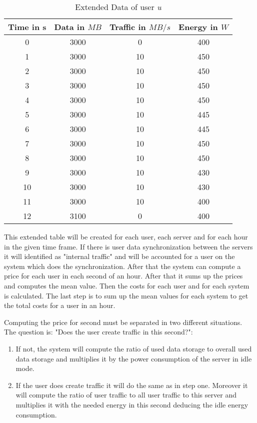  
 \begin{table}
 \centering
 \caption{Extended Data of user \textit{u}}
 \begin{tabular}{|c|c|c|c|}
  \hline Time in s & Data in $MB$ & Traffic in $MB/s$ & Energy in $W$ \\ 
   \hline 0 & 3000 & 0 & 400 \\ 
  \hline 1 & 3000 & 10 & 450 \\ 
  \hline 2 & 3000 & 10 & 450 \\ 
  \hline 3 & 3000 & 10 & 450\\ 
  \hline 4 & 3000 & 10 & 450 \\ 
  \hline 5 & 3000 & 10 & 445 \\
  \hline 6 & 3000 & 10 & 445 \\ 
  \hline 7 & 3000 & 10 & 450\\ 
  \hline 8 & 3000 & 10 & 450 \\ 
  \hline 9 & 3000 & 10 & 430 \\  
  \hline 10 & 3000 & 10 & 430 \\
   \hline 11 & 3000 & 10 & 400 \\
  \hline 12 & 3100 & 0 & 400 \\  
  \hline 
  \end{tabular}
  \label{tb2} 
  \end{table}
  
  This extended table will be created for each user, each server and for each hour in the given time frame. If there is user data synchronization between the servers it will identified as "internal traffic" and will be accounted for a user on the system which does the synchronization. After that the system can compute a price for each user in each second of an hour. After that it sums up the prices and computes the mean value. Then the costs for each user and for each system is calculated. The last step is to sum up the mean values for each system to get the total costs for a user in an hour.
  
  Computing the price for second must be separated in two different situations. The question is: "Does the user create traffic in this second?":
  \begin{enumerate}
	\item
	If not, the system will compute the ratio of used data storage to overall used data storage and multiplies it by the power consumption of the server in idle mode.
	\item
	If the user does create traffic it will do the same as in step one. Moreover it will compute the ratio of user traffic to all user traffic to this server and multiplies it with the needed energy in this second deducing the idle energy consumption.
  \end{enumerate}
  
